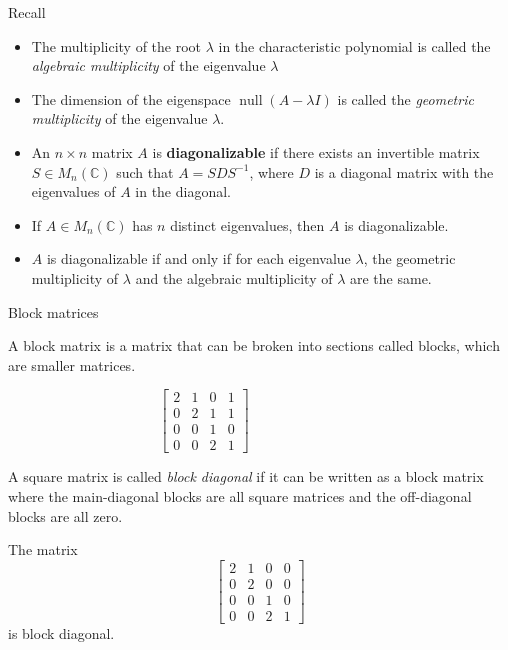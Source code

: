 \documentclass [aspectratio=169]{beamer}
\newcommand{\C}{{\mathbb{C}}}
\newcommand{\inv}{{-1}}
\DeclareMathOperator{\nullspace}{null}
\begin{document}
\begin{frame}{Recall}
\begin{itemize}
\setlength\itemsep{0.5em}
	\item The multiplicity of the root $\lambda$ in the characteristic polynomial is called the \emph{algebraic multiplicity} of the eigenvalue $\lambda$
	\item The dimension of the eigenspace $\nullspace (A - \lambda I)$ is called the \emph{geometric multiplicity} of the eigenvalue $\lambda$.
	\item An $n \times n$ matrix $A$ is \textbf{diagonalizable} if there exists an invertible matrix $S\in M_n(\C)$ such that $A = SDS^\inv$, where $D$ is a diagonal matrix with the eigenvalues of $A$ in the diagonal.
	\item If $A\in M_n(\C)$ has $n$ distinct eigenvalues, then $A$ is diagonalizable. 
	\item $A$ is diagonalizable if and only if for each eigenvalue $\lambda$, the geometric multiplicity of $\lambda$ and the algebraic multiplicity of $\lambda$ are the same.
\end{itemize}

\end{frame}


\begin{frame}{Block matrices}
\begin{definition}
A block matrix is a matrix that can be broken into sections called blocks, which are smaller matrices.
\end{definition}

\begin{example}
$$ \begin{bmatrix} 2 & 1 & 0 & 1  \\ 0 & 2 &1 & 1 \\ 0 & 0 & 1 & 0 \\ 0 & 0 & 2 & 1 \end{bmatrix} \qquad \qquad \qquad \qquad$$
\vspace{2cm}
\end{example}

\end{frame}


\begin{frame}

\begin{definition}
A square matrix is called \emph{block diagonal} if it can be written as a block matrix where the main-diagonal blocks are all square matrices and the off-diagonal blocks are all zero.
\end{definition}

\begin{example}
The matrix
$$ \begin{bmatrix} 2 & 1 & 0 & 0  \\ 0 & 2 &0 & 0 \\ 0 & 0 & 1 & 0 \\ 0 & 0 & 2 & 1 \end{bmatrix} $$
is block diagonal.
\end{example}
\end{frame}
\end{document}
